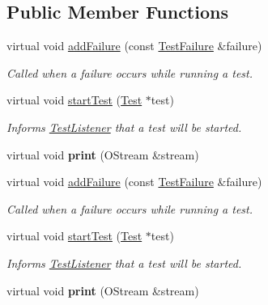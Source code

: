 \subsection*{Public Member Functions}
\begin{DoxyCompactItemize}
\item 
virtual void \hyperlink{class_text_test_result_a721d2df2af00cbb4bc0f30035729f5ad}{add\+Failure} (const \hyperlink{class_test_failure}{Test\+Failure} \&failure)
\begin{DoxyCompactList}\small\item\em Called when a failure occurs while running a test. \end{DoxyCompactList}\item 
\hypertarget{class_text_test_result_a1c3055ab6c4d234d0306938b0bd71283}{virtual void \hyperlink{class_text_test_result_a1c3055ab6c4d234d0306938b0bd71283}{start\+Test} (\hyperlink{class_test}{Test} $\ast$test)}\label{class_text_test_result_a1c3055ab6c4d234d0306938b0bd71283}

\begin{DoxyCompactList}\small\item\em Informs \hyperlink{class_test_listener}{Test\+Listener} that a test will be started. \end{DoxyCompactList}\item 
\hypertarget{class_text_test_result_a0f205e29b15c5fc203e9a4df149a918e}{virtual void {\bfseries print} (O\+Stream \&stream)}\label{class_text_test_result_a0f205e29b15c5fc203e9a4df149a918e}

\item 
virtual void \hyperlink{class_text_test_result_a05d3b0e8e51b3430092166bbc3d17708}{add\+Failure} (const \hyperlink{class_test_failure}{Test\+Failure} \&failure)
\begin{DoxyCompactList}\small\item\em Called when a failure occurs while running a test. \end{DoxyCompactList}\item 
\hypertarget{class_text_test_result_a2191f5e916fca83151fb657b31dcd30d}{virtual void \hyperlink{class_text_test_result_a2191f5e916fca83151fb657b31dcd30d}{start\+Test} (\hyperlink{class_test}{Test} $\ast$test)}\label{class_text_test_result_a2191f5e916fca83151fb657b31dcd30d}

\begin{DoxyCompactList}\small\item\em Informs \hyperlink{class_test_listener}{Test\+Listener} that a test will be started. \end{DoxyCompactList}\item 
\hypertarget{class_text_test_result_a35fdfec0767de9f4c4fa0e319dfedb3b}{virtual void {\bfseries print} (O\+Stream \&stream)}\label{class_text_test_result_a35fdfec0767de9f4c4fa0e319dfedb3b}

\end{DoxyCompactItemize}
